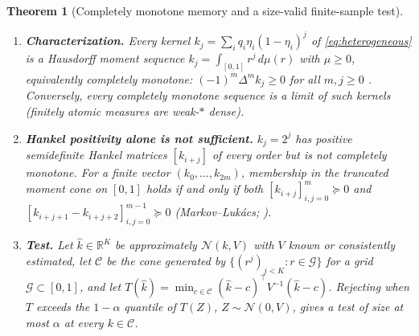 \documentclass[10pt,twocolumn,letterpaper]{article}
\newtheorem{theorem}{Theorem}[section]
\theoremstyle{definition}
\theoremstyle{remark}
\newcommand{\R}{\mathbb{R}}
\begin{document}
\begin{theorem}[Completely monotone memory and a size-valid finite-sample test]
\label{thm:m4_completely_monotone}
\begin{enumerate}
    \item \textbf{Characterization.} Every kernel $k_j=\sum_iq_i\eta_i(1-\eta_i)^j$ of \eqref{eq:heterogeneous} is a Hausdorff moment sequence $k_j=\int_{[0,1]}r^j\,d\mu(r)$ with $\mu\ge0$, equivalently completely monotone: $(-1)^m\Delta^mk_j\ge0$ for all $m,j\ge0$ \citep{hausdorff1921}. Conversely, every completely monotone sequence is a limit of such kernels (finitely atomic measures are weak-$*$ dense).
    \item \textbf{Hankel positivity alone is not sufficient.} $k_j=2^j$ has positive semidefinite Hankel matrices $[k_{i+j}]$ of every order but is not completely monotone. For a finite vector $(k_0,\ldots,k_{2m})$, membership in the truncated moment cone on $[0,1]$ holds if and only if \emph{both} $[k_{i+j}]_{i,j=0}^m\succeq0$ and $[k_{i+j+1}-k_{i+j+2}]_{i,j=0}^{m-1}\succeq0$ (Markov--Luk\'acs; \citealp{krein1977}).
    \item \textbf{Test.} Let $\hat k\in\R^K$ be approximately $\mathcal N(k,V)$ with $V$ known or consistently estimated, let $\mathcal C$ be the cone generated by $\{(r^j)_{j<K}:r\in\mathcal G\}$ for a grid $\mathcal G\subset[0,1]$, and let $T(\hat k)=\min_{c\in\mathcal C}(\hat k-c)^\top V^{-1}(\hat k-c)$. Rejecting when $T$ exceeds the $1-\alpha$ quantile of $T(Z)$, $Z\sim\mathcal N(0,V)$, gives a test of size at most $\alpha$ at every $k\in\mathcal C$.
\end{enumerate}
\end{theorem}
\end{document}
